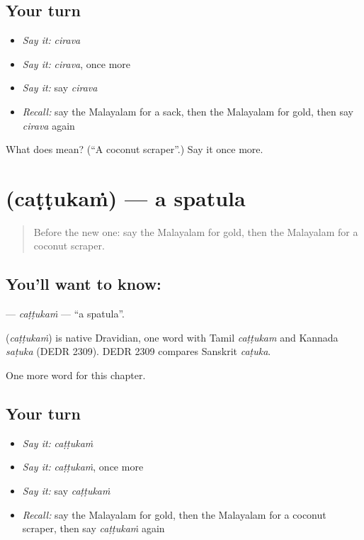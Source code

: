 \subsection*{Your turn}
\begin{itemize}
\raggedright
  \item \emph{Say it:} \emph{cirava}
  \item \emph{Say it:} \emph{cirava}, once more
  \item \emph{Say it:} say \emph{cirava}
  \item \emph{Recall:} say the Malayalam for a sack, then the Malayalam for gold, then say \emph{cirava} again
\end{itemize}

\begin{tcolorbox}[breakable,colback=teal!4,colframe=teal!35!black,title={Before you move on}]
What does  mean? (\textquotedblleft{}A coconut scraper\textquotedblright{}.) Say it once more.
\end{tcolorbox}
\section[\texorpdfstring{\ml{ചട്ടുകം} (caṭṭukaṁ)}{ചട്ടുകം (caṭṭukaṁ)}]{ (caṭṭukaṁ) — a spatula}

\label{lesson:ML-C331-cattukam}



\begin{quote}
Before the new one: say the Malayalam for gold, then the Malayalam for a coconut scraper.
\end{quote}

\subsection*{You'll want to know: }
\textbf{} — \emph{caṭṭukaṁ} — \textquotedblleft{}a spatula\textquotedblright{}.

\begin{cousinweb}
\textbf{} (\emph{caṭṭukaṁ}) is native Dravidian, one word with Tamil \emph{caṭṭukam} and Kannada \emph{saṭuka} (DEDR 2309). DEDR 2309 compares Sanskrit \emph{caṭuka}.
\end{cousinweb}

\begin{grammarlens}[title={What you've built}]
One more word for this chapter.
\end{grammarlens}

\subsection*{Your turn}
\begin{itemize}
\raggedright
  \item \emph{Say it:} \emph{caṭṭukaṁ}
  \item \emph{Say it:} \emph{caṭṭukaṁ}, once more
  \item \emph{Say it:} say \emph{caṭṭukaṁ}
  \item \emph{Recall:} say the Malayalam for gold, then the Malayalam for a coconut scraper, then say \emph{caṭṭukaṁ} again
\end{itemize}

